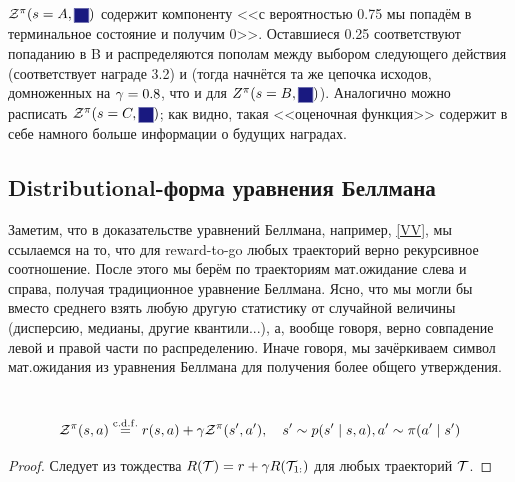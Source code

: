 \begin{exampleBox}[label=ex:zfunction]{}
$\Z^{\pi}(s \HM= A, \text{\colorsquare{ChadBlue}})$ содержит компоненту <<с вероятностью 0.75 мы попадём в терминальное состояние и получим 0>>. Оставшиеся 0.25 соответствуют попаданию в B и распределяются пополам между выбором следующего действия  (соответствует награде 3.2) и  (тогда начнётся та же цепочка исходов, домноженных на $\gamma \HM= 0.8$, что и для $Z^{\pi}(s \HM= B, \colorsquare{ChadBlue})$). Аналогично можно расписать $\Z^{\pi}(s \HM= C, \text{\colorsquare{ChadBlue}})$; как видно, такая <<оценочная функция>> содержит в себе намного больше информации о будущих наградах.
\end{exampleBox}

\subsection{Distributional-форма уравнения Беллмана}

Заметим, что в доказательстве уравнений Беллмана, например, \eqref{VV}, мы ссылаемся на то, что для reward-to-go любых траекторий верно рекурсивное соотношение. После этого мы берём по траекториям мат.ожидание слева и справа, получая традиционное уравнение Беллмана. Ясно, что мы могли бы вместо среднего взять любую другую статистику от случайной величины (дисперсию, медианы, другие квантили...), а, вообще говоря, верно совпадение левой и правой части по распределению. Иначе говоря, мы зачёркиваем символ мат.ожидания из уравнения Беллмана для получения более общего утверждения.

\begin{theorem}\,
\begin{equation}\label{ZZ}
 \mathcal{Z}^\pi(s, a) \mathrel{\stackrel{\mathrm{c.d.f.}}=} r(s, a) + \gamma \mathcal{Z}^\pi(s', a'), \quad s' \sim p(s' \mid s, a), a' \sim \pi(a' \mid s') 
\end{equation}
\begin{proof}
Следует из тождества $R(\mathcal{T}) = r + \gamma R(\mathcal{T}_{1:})$ для любых траекторий $\mathcal{T}$.
\end{proof}
\end{theorem}

